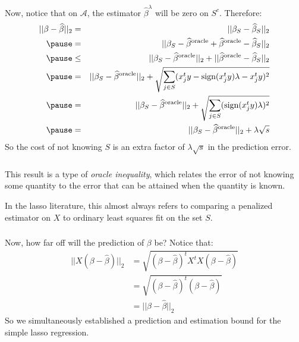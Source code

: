 \begin{frame}[fragile] \frametitle{}

Now, notice that on $\mathcal{A}$, the estimator
$\widehat{\beta}^\lambda$ will be zero on $S^c$. Therefore:
\begin{eqnarray*}
|| \beta - \widehat{\beta} ||_2
 &=& || \beta_S - \widehat{\beta}_S ||_2 \\ \pause
 &=& || \beta_S - \widehat{\beta}^{\text{oracle}}  + \widehat{\beta}^{\text{oracle}} - \widehat{\beta}_S ||_2 \\ \pause
 &\leq& || \beta_S - \widehat{\beta}^{\text{oracle}} ||_2  + || \widehat{\beta}^{\text{oracle}} - \widehat{\beta}_S ||_2 \\ \pause
 &=& || \beta_S - \widehat{\beta}^{\text{oracle}} ||_2  + \sqrt{\sum_{j \in S} ( x_j^t y - \text{sign} (x_j^t y) \lambda - x_j^t y )^2} \\ \pause
 &=& || \beta_S - \widehat{\beta}^{\text{oracle}} ||_2  + \sqrt{\sum_{j \in S} (\text{sign} (x_j^t y) \lambda )^2} \\ \pause
 &=& || \beta_S - \widehat{\beta}^{\text{oracle}} ||_2  + \lambda\sqrt{s}  \\
\end{eqnarray*}
\pause So the cost of not knowing $S$ is an extra factor of $\lambda \sqrt{s}$ in the prediction error.

\end{frame}


\begin{frame}[fragile] \frametitle{}

This result is a type of \textit{oracle inequality}, which
relates the error of not knowing some quantity to the error
that can be attained when the quantity is known.

In the lasso literature, this almost always refers to comparing
a penalized estimator on $X$ to ordinary least squares fit on the
set $S$.

\end{frame}

\begin{frame}[fragile] \frametitle{}

Now, how far off will the prediction of $\beta$ be? Notice that:
\begin{align*}
|| X (\beta - \widehat{\beta}) ||_2 &= \sqrt{(\beta - \widehat{\beta})^t X^t X (\beta - \widehat{\beta})}\\
&= \sqrt{(\beta - \widehat{\beta})^t (\beta - \widehat{\beta})}\\
&= || \beta - \widehat{\beta} ||_2
\end{align*}
So we simultaneously established a prediction and estimation bound
for the simple lasso regression.

\end{frame}

